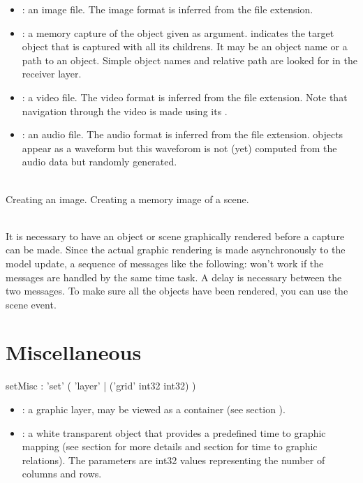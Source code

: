 \documentclass[a4paper,twoside]{report}
\newcommand{\sublevel}[1]	{\section{#1}}
\begin{document}
\begin{itemize}
\item {}: an image file. The image format is inferred from the file extension.
\item {}: a memory capture of the object given as argument.  indicates the target object that is captured with all its childrens. It may be an object name or a path to an object. Simple object names and relative path are looked for in the receiver layer.
\item {}: a video file. The video format is inferred from the file extension. Note that navigation through the video is made using its .
\item {}: an audio file. The audio format is inferred from the file extension.  objects appear as a waveform but this waveforom is not (yet) computed from the audio data but randomly generated.
\end{itemize}

\example \\
Creating an image.
Creating a memory image of a scene.

\note{} \\
It is necessary to have an object or scene graphically rendered before a capture can be made. Since the actual graphic rendering is made asynchronously to the model update, a sequence of messages like the following:
won't work if the messages are handled by the same time task. A delay is necessary between the two messages. To make sure all the objects have been rendered, you can use the scene  event.


\sublevel{Miscellaneous}
\label{miscscore}


\begin{rail}
setMisc : 'set' (
	'layer'  |
	('grid' int32 int32)
)
\end{rail}

\begin{itemize}
\item {}: a graphic layer, may be viewed as a container (see section ).
\item {}: a white transparent object that provides a predefined time to graphic mapping (see section  for more details and section  for time to graphic relations). The parameters are int32 values representing the number of columns and rows.
\end{itemize}
\end{document}
